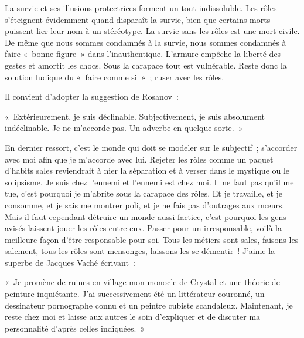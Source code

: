 \documentclass[french,twoside]{book} %
\newenvironment{quoteblock}%
  {\begin{quoting}}
  {\end{quoting}}
\newenvironment{quotebar}{%
    \def\FrameCommand{{\color{rubric!10!}\vrule width 0.5em} \hspace{0.9em}}%
    \def\OuterFrameSep{\itemsep} %
    \MakeFramed {\advance\hsize-\width \FrameRestore}
  }%
  {%
    \endMakeFramed
  }
\renewenvironment{quoteblock}%
  {%
    \savenotes
    \setstretch{0.9}
    \normalfont
    \begin{quotebar}
  }
  {%
    \end{quotebar}
    \spewnotes
  }
\begin{document}
La survie et ses illusions protectrices forment un tout indissoluble. Les rôles s’éteignent évidemment quand disparaît la survie, bien que certains morts puissent lier leur nom à un stéréotype. La survie sans les rôles est une mort civile. De même que nous sommes condamnés à la survie, nous sommes condamnés à faire « bonne figure » dans l’inauthentique. L’armure empêche la liberté des gestes et amortit les chocs. Sous la carapace tout est vulnérable. Reste donc la solution ludique du « faire comme si » ; ruser avec les rôles.\par
Il convient d’adopter la suggestion de Rosanov :\par

\begin{quoteblock}
\noindent « Extérieurement, je suis déclinable. Subjectivement, je suis absolument indéclinable. Je ne m’accorde pas. Un adverbe en quelque sorte. »\end{quoteblock}

\noindent En dernier ressort, c’est le monde qui doit se modeler sur le subjectif ; s’accorder avec moi afin que je m’accorde avec lui. Rejeter les rôles comme un paquet d’habits sales reviendrait à nier la séparation et à verser dans le mystique ou le solipsisme. Je suis chez l’ennemi et l’ennemi est chez moi. Il ne faut pas qu’il me tue, c’est pourquoi je m’abrite sous la carapace des rôles. Et je travaille, et je consomme, et je sais me montrer poli, et je ne fais pas d’outrages aux mœurs. Mais il faut cependant détruire un monde aussi factice, c’est pourquoi les gens avisés laissent jouer les rôles entre eux. Passer pour un irresponsable, voilà la meilleure façon d’être responsable pour soi. Tous les métiers sont sales, faisons-les salement, tous les rôles sont mensonges, laissons-les se démentir ! J’aime la superbe de Jacques Vaché écrivant :\par

\begin{quoteblock}
\noindent « Je promène de ruines en village mon monocle de Crystal et une théorie de peinture inquiétante. J’ai successivement été un littérateur couronné, un dessinateur pornographe connu et un peintre cubiste scandaleux. Maintenant, je reste chez moi et laisse aux autres le soin d’expliquer et de discuter ma personnalité d’après celles indiquées. »\end{quoteblock}
\end{document}
